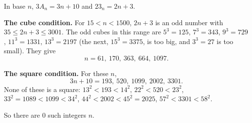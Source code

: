 In base $n$, $3A_n=3n+10$ and $23_n=2n+3$.

\textbf{The cube condition.} For $15<n<1500$, $2n+3$ is an odd number with $35\le2n+3\le3001$. The odd cubes in this range are $5^3=125$, $7^3=343$, $9^3=729$, $11^3=1331$, $13^3=2197$ (the next, $15^3=3375$, is too big, and $3^3=27$ is too small). They give
\[
n=61,\ 170,\ 363,\ 664,\ 1097 .
\]

\textbf{The square condition.} For these $n$,
\[
3n+10=193,\ 520,\ 1099,\ 2002,\ 3301 .
\]
None of these is a square: $13^2<193<14^2$, $22^2<520<23^2$, $33^2=1089<1099<34^2$, $44^2<2002<45^2=2025$, $57^2<3301<58^2$.

So there are $\boxed{0}$ such integers $n$.
